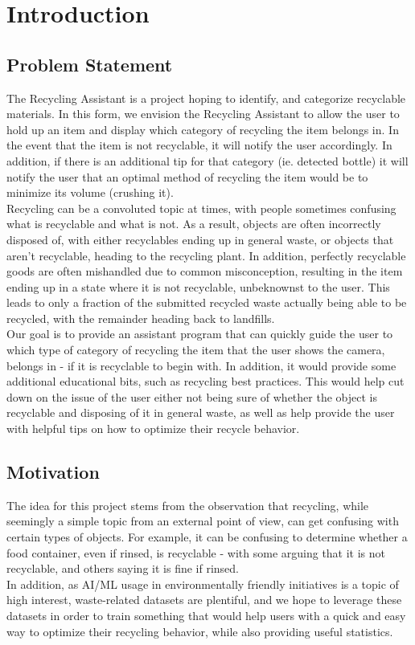 \documentclass[conference]{IEEEtran}
\begin{document}
\newpage

\section{Introduction}
\subsection{Problem Statement}
The Recycling Assistant is a project hoping to identify, and categorize recyclable materials. In this form, we envision the Recycling Assistant to allow the user to hold up an item and display which category of recycling the item belongs in. In the event that the item is not recyclable, it will notify the user accordingly. In addition, if there is an additional tip for that category (ie. detected bottle) it will notify the user that an optimal method of recycling the item would be to minimize its volume (crushing it). \\
Recycling can be a convoluted topic at times, with people sometimes confusing what is recyclable and what is not. As a result, objects are often incorrectly disposed of, with either recyclables ending up in general waste, or objects that aren't recyclable, heading to the recycling plant. In addition, perfectly recyclable goods are often mishandled due to common misconception, resulting in the item ending up in a state where it is not recyclable, unbeknownst to the user. This leads to only a fraction of the submitted recycled waste actually being able to be recycled, with the remainder heading back to landfills. \\

Our goal is to provide an assistant program that can quickly guide the user to which type of category of recycling the item that the user shows the camera, belongs in - if it is recyclable to begin with. In addition, it would provide some additional educational bits, such as recycling best practices. This would help cut down on the issue of the user either not being sure of whether the object is recyclable and disposing of it in general waste, as well as help provide the user with helpful tips on how to optimize their recycle behavior.\\

\subsection{Motivation}

The idea for this project stems from the observation that recycling, while seemingly a simple topic from an external point of view, can get confusing with certain types of objects. For example, it can be confusing to determine whether a food container, even if rinsed, is recyclable - with some arguing that it is not recyclable, and others saying it is fine if rinsed.\\
In addition, as AI/ML usage in environmentally friendly initiatives is a topic of high interest, waste-related datasets are plentiful, and we hope to leverage these datasets in order to train something that would help users with a quick and easy way to optimize their recycling behavior, while also providing useful statistics.\\
\end{document}
